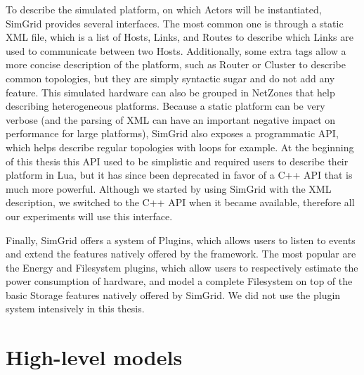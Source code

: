 To describe the simulated platform, on which Actors will be instantiated,
SimGrid provides several interfaces. The most common one is through a static XML
file, which is a list of Hosts, Links, and Routes to describe which Links are
used to communicate between two Hosts. Additionally, some extra tags allow a
more concise description of the platform, such as Router or Cluster to describe
common topologies, but they are simply syntactic sugar and do not add any
feature. This simulated hardware can also be grouped in NetZones that help
describing heterogeneous platforms. Because a static platform can be very
verbose (and the parsing of XML can have an important negative impact on
performance for large platforms), SimGrid also exposes a programmatic API, which
helps describe regular topologies with loops for example. At the beginning of
this thesis this API used to be simplistic and required users to describe their
platform in Lua, but it has since been deprecated in favor of a C++ API that is
much more powerful. Although we started by using SimGrid with the XML
description, we switched to the C++ API when it became available, therefore all
our experiments will use this interface.

Finally, SimGrid offers a system of Plugins, which allows users to listen to
events and extend the features natively offered by the framework. The most
popular are the Energy and Filesystem plugins, which allow users to respectively
estimate the power consumption of hardware, and model a complete Filesystem on
top of the basic Storage features natively offered by SimGrid. We did not use
the plugin system intensively in this thesis.

\section{High-level models}

